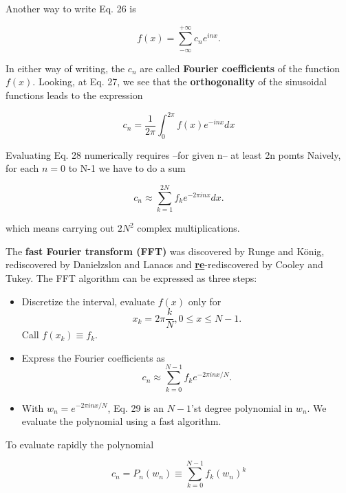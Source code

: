 Another way to write Eq. 26 is

\begin{equation}
f(x) = \sum_{-\infty}^{+\infty} c_{n}e^{inx}.
\end{equation}

In either way of writing, the $c_{n}$ are called \textbf{Fourier coefficients} of the function $f(x)$. Looking, \eg at Eq. 27, we see that the \textbf{orthogonality} of the sinusoidal functions leads to the expression

\begin{equation}
c_{n} = \frac{1}{2\pi}\int_{0}^{2\pi}f(x)e^{-inx}dx
\end{equation}

Evaluating Eq. 28 numerically requires --for given n-- at least 2n pomts Naively, for each $n = 0$ to N-1 we have to do a sum

\begin{equation}
c_{n} \approx \sum_{k=1}^{2N}f_{k}e^{-2\pi inx}dx .
\end{equation}

which means carrying out $2N^2$ complex multiplications.

The \textbf{fast Fourier transform (FFT)} was discovered by Runge and K\"{o}nig, rediscovered by Danielzslon and Lanaos and \textbf{\underline{re}}-rediscovered by Cooley and Tukey. The FFT algorithm can be expressed as three steps:

\begin{itemize}
    \item Discretize the interval, \ie evaluate $f(x)$ only for
    \begin{equation}
        x_{k} = 2\pi \frac{k}{N} , 0 \leq x \leq N-1.
    \end{equation}
    Call $f(x_k) \equiv f_k$.
    \item   Express the Fourier coefficients as
    \begin{equation}
        c_{n} \approx \sum_{k=0}^{N-1}f_{k}e^{-2\pi inx/N} .
    \end{equation}
    \item With $w_{n} = e^{-2\pi inx/N}$, Eq. 29 is an $N-1$’st degree polynomial in $w_{n}$. We evaluate the polynomial using a fast algorithm.
\end{itemize}

To evaluate rapidly the polynomial

\begin{equation}
c_{n} = P_{n}(w_{n}) \equiv \sum_{k=0}^{N-1}f_{k}(w_{n})^k
\end{equation}

